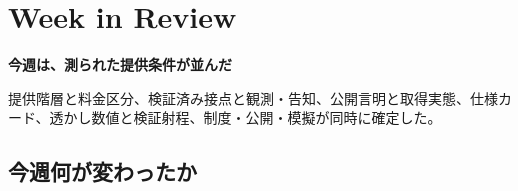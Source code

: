 \section{Week in Review}
\begin{wideflow}
{\Large\bfseries 今週は、測られた提供条件が並んだ}\par
\smallskip
{\color{SurveyMuted}提供階層と料金区分、検証済み接点と観測・告知、公開言明と取得実態、仕様カード、透かし数値と検証射程、制度・公開・模擬が同時に確定した。}\par
\end{wideflow}

\subsection*{今週何が変わったか}
